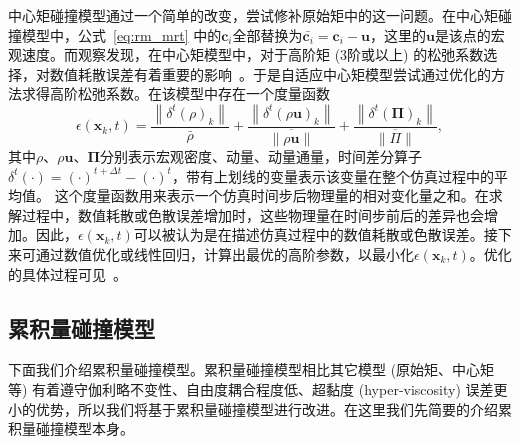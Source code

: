 中心矩碰撞模型通过一个简单的改变，尝试修补原始矩中的这一问题。在中心矩碰撞模型中，公式~\ref{eq:rm_mrt} 中的$\boldsymbol{c}_{i}$全部替换为$\bar{\boldsymbol{c}_{i}}=\boldsymbol{c}_{i}-\boldsymbol{u}$，这里的$\boldsymbol{u}$是该点的宏观速度。而观察发现，在中心矩模型中，对于高阶矩 (3阶或以上) 的松弛系数选择，对数值耗散误差有着重要的影响~\citep{Li-2020}。于是自适应中心矩模型尝试通过优化的方法求得高阶松弛系数。在该模型中存在一个度量函数
\begin{equation}
    \epsilon\left(\mathbf{x}_k, t\right)=\frac{\left\|\delta^t(\rho)_k\right\|}{\bar{\rho}}+\frac{\left\|\delta^t(\rho \mathbf{u})_k\right\|}{\overline{\|\rho \mathbf{u}\|}}+\frac{\left\|\delta^t(\boldsymbol{\Pi})_k\right\|}{\overline{\|\Pi\|}},
\end{equation}
其中$\rho$、$\rho \mathbf{u}$、$\boldsymbol{\Pi}$分别表示宏观密度、动量、动量通量，时间差分算子$\delta^t(\cdot)=(\cdot)^{t+\Delta t}-(\cdot)^{t}$，带有上划线的变量表示该变量在整个仿真过程中的平均值。
这个度量函数用来表示一个仿真时间步后物理量的相对变化量之和。在求解过程中，数值耗散或色散误差增加时，这些物理量在时间步前后的差异也会增加。因此，$\epsilon(\mathbf{x}_k, t)$可以被认为是在描述仿真过程中的数值耗散或色散误差。接下来可通过数值优化或线性回归，计算出最优的高阶参数，以最小化$\epsilon\left(\mathbf{x}_k, t\right)$。优化的具体过程可见~\citep{Li-2020}。

\subsection{累积量碰撞模型}
\label{sec:cumulant}
下面我们介绍累积量碰撞模型。累积量碰撞模型相比其它模型 (原始矩、中心矩等) 有着遵守伽利略不变性、自由度耦合程度低、超黏度 (hyper-viscosity) 误差更小的优势，所以我们将基于累积量碰撞模型进行改进。在这里我们先简要的介绍累积量碰撞模型本身。

